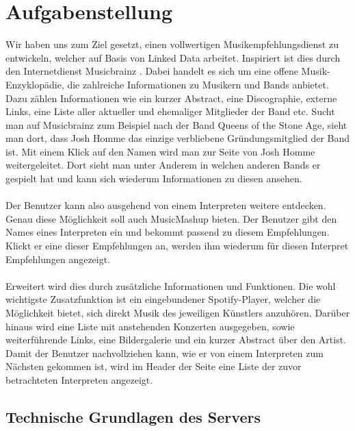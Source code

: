 \section{Aufgabenstellung}


Wir haben uns zum Ziel gesetzt, einen vollwertigen Musikempfehlungsdienst zu entwickeln, welcher auf Basis von Linked Data arbeitet. Inspiriert ist dies durch den Internetdienst Musicbrainz \cite{musicbrainz}. Dabei handelt es sich um eine offene Musik-Enzyklopädie, die zahlreiche Informationen zu Musikern und Bands anbietet. Dazu zählen Informationen wie ein kurzer Abstract, eine Discographie, externe Links, eine Liste aller aktueller und ehemaliger Mitglieder der Band etc. Sucht man auf Musicbrainz zum Beispiel nach der Band \glqq Queens of the Stone Age\grqq, sieht man dort, dass Josh Homme das einzige verbliebene Gründungsmitglied der Band ist. Mit einem Klick auf den Namen wird man zur Seite von Josh Homme weitergeleitet. Dort sieht man unter Anderem in welchen anderen Bands er gespielt hat und kann sich wiederum Informationen zu diesen ansehen.

\paragraph{} Der Benutzer kann also ausgehend von einem Interpreten weitere entdecken. Genau diese Möglichkeit soll auch MusicMashup bieten. Der Benutzer gibt den Names eines Interpreten ein und bekommt passend zu diesem Empfehlungen. Klickt er eine dieser Empfehlungen an, werden ihm wiederum für diesen Interpret Empfehlungen angezeigt. 


\paragraph{} Erweitert wird dies durch zusätzliche Informationen und Funktionen. Die wohl wichtigste Zusatzfunktion ist ein eingebundener Spotify-Player, welcher die Möglichkeit bietet, sich direkt Musik des jeweiligen Künstlers anzuhören. Darüber hinaus wird eine Liste mit anstehenden Konzerten ausgegeben, sowie weiterführende Links, eine Bildergalerie und ein kurzer Abstract über den Artist. Damit der Benutzer nachvollziehen kann, wie er von einem Interpreten zum Nächsten gekommen ist, wird im Header der Seite eine Liste der zuvor betrachteten Interpreten angezeigt.

\subsection{Technische Grundlagen des Servers}

